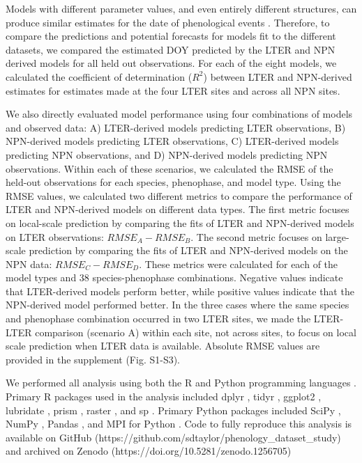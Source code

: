 \documentclass[fleqn,12pt,lineno]{article}
\begin{document}
Models with different parameter values, and even entirely different structures, can produce similar estimates for the date of phenological events \citep{basler2016}. Therefore, to compare the predictions and potential forecasts for models fit to the different datasets, we compared the estimated DOY predicted by the LTER and NPN derived models for all held out observations. For each of the eight models, we calculated the coefficient of determination ($R^2$) between LTER and NPN-derived estimates for estimates made at the four LTER sites and across all NPN sites.  

We also directly evaluated model performance using four combinations of models and observed data: A) LTER-derived models predicting LTER observations, B) NPN-derived models predicting LTER observations, C) LTER-derived models predicting NPN observations, and D) NPN-derived models predicting NPN observations. Within each of these scenarios, we calculated the RMSE of the held-out observations for each species, phenophase, and model type. Using the RMSE values, we calculated two different metrics to compare the performance of LTER and NPN-derived models on different data types. The first metric focuses on local-scale prediction by comparing the fits of LTER and NPN-derived models on LTER observations: $RMSE_{A} - RMSE_{B}$. The second metric focuses on large-scale prediction by comparing the fits of LTER and NPN-derived models on the NPN data: $RMSE_{C} - RMSE_{D}$. These metrics were calculated for each of the model types and 38 species-phenophase combinations. Negative values indicate that LTER-derived models perform better, while positive values indicate that the NPN-derived model performed better. In the three cases where the same species and phenophase combination occurred in two LTER sites, we made the LTER-LTER comparison (scenario A) within each site, not across sites, to focus on local scale prediction when LTER data is available. Absolute RMSE values are provided in the supplement (Fig. S1-S3).

We performed all analysis using both the R and Python programming languages \citep{rcitation, python}. Primary R packages used in the analysis included dplyr \citep{dplyr}, tidyr \citep{tidyr}, ggplot2 \citep{ggplot2}, lubridate \citep{lubridate}, prism \citep{prismR}, raster \citep{rasterR}, and sp \citep{sp1}. Primary Python packages included SciPy \citep{scipy}, NumPy \citep{numpy}, Pandas \citep{pandas}, and MPI for Python \citep{mpi4py}. Code to fully reproduce this analysis is available on GitHub  (https://github.com/sdtaylor/phenology\_dataset\_study) and archived on Zenodo  (https://doi.org/10.5281/zenodo.1256705)
\end{document}
